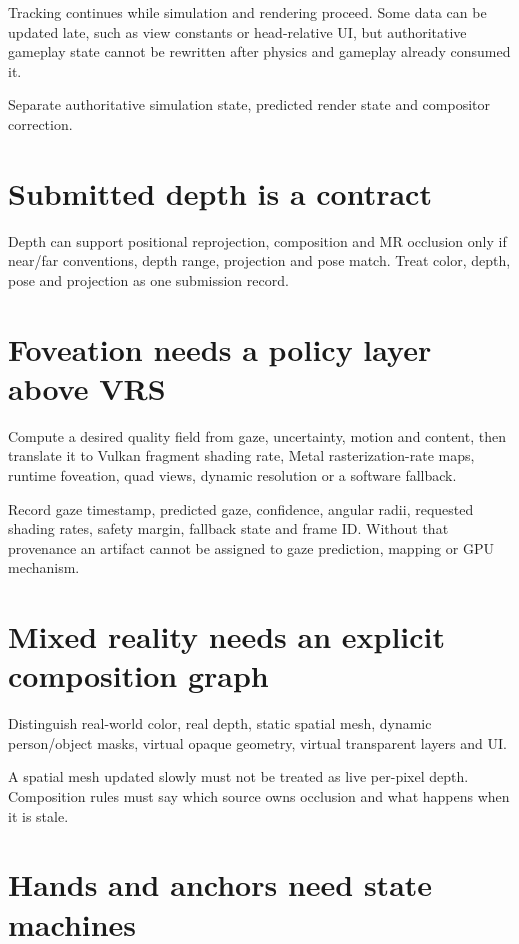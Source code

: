 Tracking continues while simulation and rendering proceed. Some data can be updated late, such as view constants or head-relative UI, but authoritative gameplay state cannot be rewritten after physics and gameplay already consumed it.

Separate authoritative simulation state, predicted render state and compositor correction.

\section{Submitted depth is a contract}\label{06-engine-ii-ch042-submitted-depth-is-a-contract}

Depth can support positional reprojection, composition and MR occlusion only if near/far conventions, depth range, projection and pose match. Treat color, depth, pose and projection as one submission record.

\section{Foveation needs a policy layer above VRS}\label{06-engine-ii-ch042-foveation-needs-a-policy-layer-above-vrs}

Compute a desired quality field from gaze, uncertainty, motion and content, then translate it to Vulkan fragment shading rate, Metal rasterization-rate maps, runtime foveation, quad views, dynamic resolution or a software fallback.

Record gaze timestamp, predicted gaze, confidence, angular radii, requested shading rates, safety margin, fallback state and frame ID. Without that provenance an artifact cannot be assigned to gaze prediction, mapping or GPU mechanism.

\section{Mixed reality needs an explicit composition graph}\label{06-engine-ii-ch042-mixed-reality-needs-an-explicit-composition-graph}

Distinguish real-world color, real depth, static spatial mesh, dynamic person/object masks, virtual opaque geometry, virtual transparent layers and UI.

A spatial mesh updated slowly must not be treated as live per-pixel depth. Composition rules must say which source owns occlusion and what happens when it is stale.

\section{Hands and anchors need state machines}\label{06-engine-ii-ch042-hands-and-anchors-need-state-machines}

